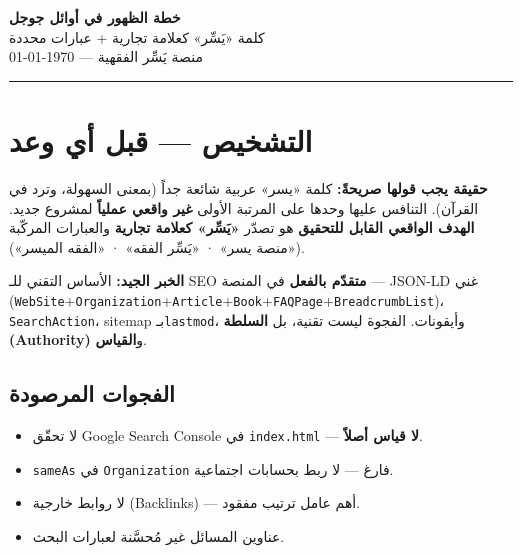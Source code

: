 \documentclass[11pt]{article}
\begin{document}
\begin{center}
  {\Huge\bfseries\color{gold} خطة الظهور في أوائل جوجل}\\[4pt]
  {\large\color{darkbg} كلمة «يَسِّر» كعلامة تجارية + عبارات محددة}\\[6pt]
  {\small\color{midgray} منصة يَسِّر الفقهية — \today}
\end{center}

\vspace{4pt}
\hrule
\vspace{10pt}

\section{التشخيص — قبل أي وعد}

\begin{warnbox}
\textbf{حقيقة يجب قولها صريحةً:} كلمة «يسر» عربية شائعة جداً (بمعنى السهولة، وترد في القرآن).
التنافس عليها وحدها على المرتبة الأولى \textbf{غير واقعي عملياً} لمشروع جديد.
\textbf{الهدف الواقعي القابل للتحقيق} هو تصدّر
\textbf{«يَسِّر» كعلامة تجارية} والعبارات المركّبة («منصة يسر» · «يَسِّر الفقه» · «الفقه الميسر»).
\end{warnbox}

\begin{goalbox}
\textbf{الخبر الجيد:} الأساس التقني للـ SEO \textbf{متقدّم بالفعل} في المنصة —
JSON-LD غني (\texttt{WebSite}+\texttt{Organization}+\texttt{Article}+\texttt{Book}+\texttt{FAQPage}+\texttt{BreadcrumbList})،
\texttt{SearchAction}، sitemap بـ\texttt{lastmod}، وأيقونات. الفجوة ليست تقنية، بل
\textbf{السلطة (Authority)} و\textbf{القياس}.
\end{goalbox}

\subsection*{الفجوات المرصودة}
\begin{itemize}
  \item لا تحقّق Google Search Console في \texttt{index.html} — \textbf{لا قياس أصلاً}.
  \item \texttt{sameAs} في \texttt{Organization} فارغ — لا ربط بحسابات اجتماعية.
  \item لا روابط خارجية (Backlinks) — أهم عامل ترتيب مفقود.
  \item عناوين المسائل غير مُحسَّنة لعبارات البحث.
\end{itemize}
\end{document}

